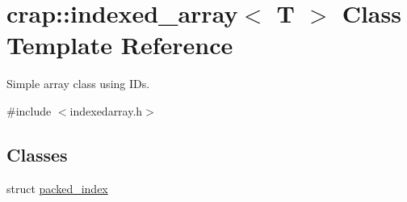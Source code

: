 \hypertarget{classcrap_1_1indexed__array}{}\section{crap\+:\+:indexed\+\_\+array$<$ T $>$ Class Template Reference}
\label{classcrap_1_1indexed__array}


Simple array class using I\+Ds.  




{\ttfamily \#include $<$indexedarray.\+h$>$}

\subsection*{Classes}
\begin{DoxyCompactItemize}
\item 
struct \hyperlink{structcrap_1_1indexed__array_1_1packed__index}{packed\+\_\+index}
\end{DoxyCompactItemize}
